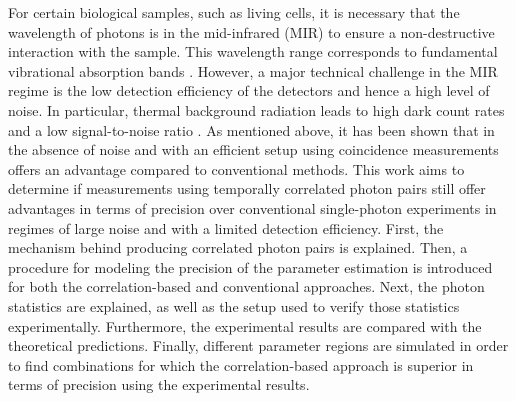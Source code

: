 For certain biological samples, such as living cells, it is necessary that the wavelength of photons is in the mid-infrared (MIR) to ensure a non-destructive interaction with the sample. This wavelength range corresponds to fundamental vibrational absorption bands \cite{katoLabelfreeVisualizationPhotosynthetic2023,ishiganeLabelfreeMidinfraredPhotothermal2023}. However, a major technical challenge in the MIR regime is the low detection efficiency of the detectors and hence a high level of noise. In particular, thermal background radiation leads to high dark count rates and a low signal-to-noise ratio \cite{SingleQuantumExcellence}. \newline
As mentioned above, it has been shown that in the absence of noise and with an efficient setup using coincidence measurements offers an advantage compared to conventional methods. This work aims to determine if measurements using temporally correlated photon pairs still offer advantages in terms of precision over conventional single-photon experiments in regimes of large noise and with a limited detection efficiency. \newline
First, the mechanism behind producing correlated photon pairs is explained. Then, a procedure for modeling the precision of the parameter estimation is introduced for both the correlation-based and conventional approaches. Next, the photon statistics are explained, as well as the setup used to verify those statistics experimentally. Furthermore, the experimental results are compared with the theoretical predictions. Finally, different parameter regions are simulated in order to find combinations for which the correlation-based approach is superior in terms of precision using the experimental results.







